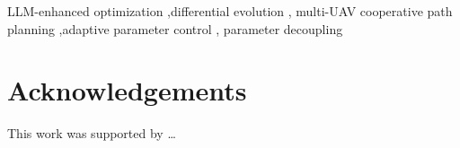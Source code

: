 \documentclass[preprint,12pt]{elsarticle}
\begin{document}
\begin{frontmatter}
  \begin{abstract}
  \end{abstract}
  \begin{keyword}
    LLM-enhanced optimization \sep differential evolution \sep
    multi-UAV cooperative path planning \sep adaptive parameter control \sep
    parameter decoupling
  \end{keyword}
\end{frontmatter}


% 

\section*{Acknowledgements}
This work was supported by \dots







\end{document}
